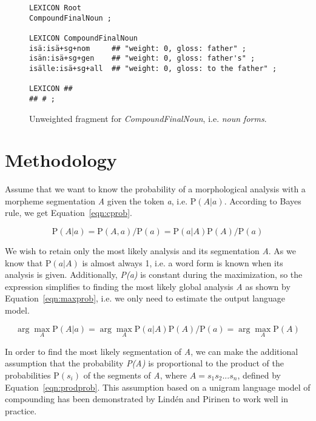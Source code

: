 \documentclass[postprint]{flammie}
\begin{document}
\begin{figure}[h!]
  \centering
  \begin{scriptsize}
\begin{verbatim}
LEXICON Root
CompoundFinalNoun ;

LEXICON CompoundFinalNoun
isä:isä+sg+nom     ## "weight: 0, gloss: father" ;
isän:isä+sg+gen    ## "weight: 0, gloss: father's" ;
isälle:isä+sg+all  ## "weight: 0, gloss: to the father" ;

LEXICON ##
## # ;
\end{verbatim}
  \end{scriptsize}
  \caption{Unweighted fragment for \emph{CompoundFinalNoun}, i.e.
    \emph{noun forms}.}\label{fig:unweighted2}
\end{figure}


\section{Methodology}  
\label{Sect3}

Assume that we want to know the probability of a morphological
analysis with a morpheme segmentation \emph{A} given the token
\emph{a}, i.e. $\mathrm{P}(A|a)$. According to Bayes rule, we get
Equation~\ref{eqn:cprob}.

\begin{equation}
  \label{eqn:cprob}
  \mathrm{P}(A|a) = \mathrm{P}(A,a)/\mathrm{P}(a) = \mathrm{P}(a|A) \mathrm{P}(A)/\mathrm{P}(a)
\end{equation}

We wish to retain only the most likely analysis and its segmentation
\emph{A}. As we know that $\mathrm{P}(a|A)$ is almost always 1, i.e. a
word form is known when its analysis is given. Additionally,
\emph{P(a)} is constant during the maximization, so the expression
simplifies to finding the most likely global analysis \emph{A} as
shown by Equation~\ref{eqn:maxprob}, i.e. we only need to estimate the
output language model.

\begin{equation}
  \label{eqn:maxprob}
  \arg\max_{A} \mathrm{P}(A|a) = \arg\max_{A} \mathrm{P}(a|A) \mathrm{P}(A)/\mathrm{P}(a) = \arg\max_{A} \mathrm{P}(A)
\end{equation}

In order to find the most likely segmentation of \emph{A}, we can make
the additional assumption that the probability \emph{P(A)} is
proportional to the product of the probabilities $\mathrm{P}(s_i)$ of
the segments of \emph{A}, where $A=s_1s_2...s_n$, defined by
Equation~\ref{eqn:prodprob}. This assumption based on a unigram
language model of compounding has been demonstrated by Lindén and
Pirinen \cite{linden09nodalida} to work well in practice.
\end{document}
